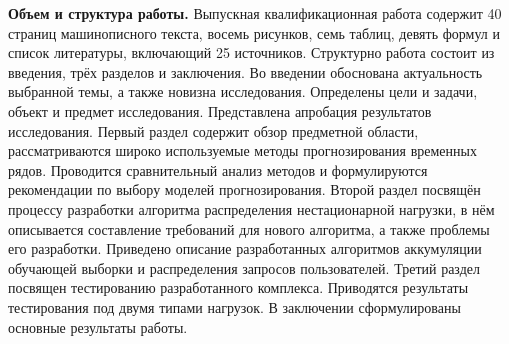 {\bfseries Объем и структура работы.} 
Выпускная квалификационная работа содержит 40 страниц машинописного 
текста, восемь рисунков, семь таблиц, девять формул и список литературы, 
включающий 25 источников. Структурно работа состоит из введения, трёх 
разделов и заключения. Во введении обоснована актуальность выбранной темы, 
а также новизна исследования. Определены цели и задачи, объект и предмет 
исследования. Представлена апробация результатов исследования. Первый 
раздел содержит обзор предметной области, рассматриваются широко 
используемые методы прогнозирования временных рядов. Проводится 
сравнительный анализ методов и формулируются рекомендации по выбору 
моделей прогнозирования. Второй раздел посвящён процессу разработки 
алгоритма распределения нестационарной нагрузки, в нём описывается 
составление требований для нового алгоритма, а также проблемы его 
разработки. Приведено описание разработанных алгоритмов аккумуляции 
обучающей выборки и распределения запросов пользователей. Третий раздел 
посвящен тестированию разработанного комплекса. Приводятся результаты 
тестирования под двумя типами нагрузок. В заключении сформулированы 
основные результаты работы.

